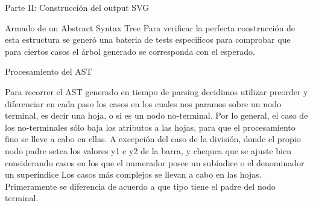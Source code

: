 \begin{section}{Parte II: Construcci\'on del output SVG}
\begin{subsection}{Armado de un Abstract Syntax Tree}
Para verificar la perfecta construcci\'on de esta estructura se gener\'o una bateria de tests especificos para comprobar que para ciertos casos el \'arbol generado se corresponda con el esperado.

\end{subsection}

\begin{subsection}{Procesamiento del AST}

Para recorrer el AST generado en tiempo de parsing decidimos utilizar preorder y diferenciar en cada paso los casos en los cuales nos paramos sobre un nodo terminal, es decir una hoja, o si es un nodo no-terminal.
Por lo general, el caso de los no-terminales s\'olo baja los atributos a las hojas, para que el procesamiento fino se lleve a cabo en ellas. A excepci\'on del caso de la divisi\'on, donde el propio nodo padre setea los valores y1 e y2 de la barra, y chequea que se ajuste bien considerando casos en los que el numerador posee un sub\'indice o el denominador un super\'indice
Los casos m\'as complejos se llevan a cabo en las hojas. Primeramente se diferencia de acuerdo a que tipo tiene el padre del nodo terminal.

\begin{itemize}


\end{itemize}
\end{subsection}
\end{section}
